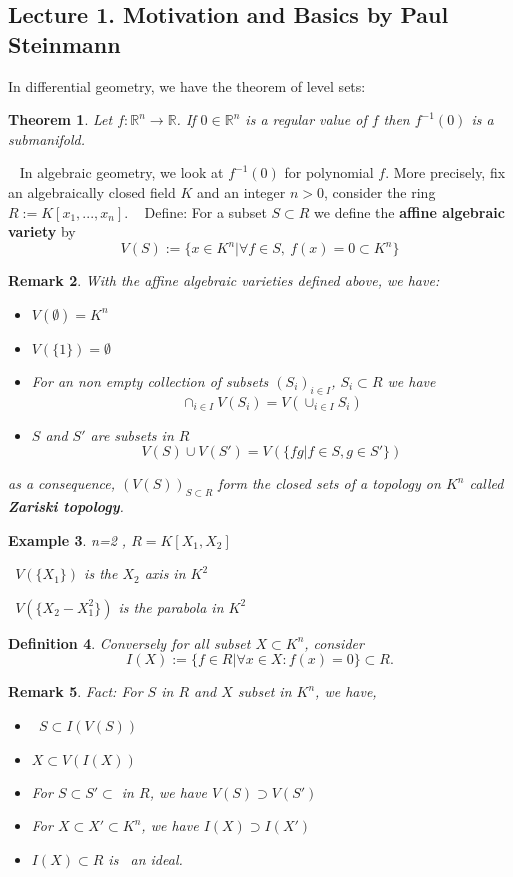 \documentclass[11pt]{article}
\newtheorem{thm}{Theorem}[section]
\newtheorem{dfn}[thm]{Definition}
\newtheorem{rmk}[thm]{Remark}
\newtheorem{ex}[thm]{Example}
\newcommand{\reals}{\mathbb R}
\begin{document}
\subsection{Lecture 1. Motivation and Basics by Paul Steinmann}
In differential geometry, we have the theorem of level sets:
\begin{thm}
Let $f:\reals^n \rightarrow \reals$.
If $0 \in \reals^n$ is a regular value of $f$ then $f^{-1}(0)$ is a submanifold.
\end{thm} 
 
In algebraic geometry, we look at $f^{-1}(0)$ for polynomial $f$.
More precisely, fix an algebraically closed field $K$ and an integer $n>0$, consider the ring $R:=K[x_1,...,x_n]$.
 
Define: For a subset $S\subset R$ we define the \textbf{affine algebraic variety} by
\begin{equation}
V(S):=\{x\in K^n| \forall f \in S,\ f(x)=0\subset K^n\}
\end{equation}
\begin{rmk}
With the affine algebraic varieties defined above, we have:
\begin{itemize}
\item $V(\emptyset)=K^n$
\item $ V(\{1\})=\emptyset$
\item   For an non empty collection of subsets $(S_i)_{i\in I}$, $S_i\subset R$ we have 
\begin{equation*}
    \cap_{i\in I}V(S_i)=V(\cup_{i\in I} S_i)
\end{equation*}
\item $S$ and $S'$ are subsets in $R$
\begin{equation*}
    V(S)\cup V(S')=V(\{fg| f\in S, g\in S'\})
\end{equation*}
\end{itemize}
as a consequence, 
    $(V(S))_{S\subset R}$ form the closed sets of a topology on $K^n$ called \textbf{Zariski topology}.
\end{rmk}
\begin{ex}
n=2 , $R=K[X_1,X_2]$

 $V(\{X_1\})$ is the $X_2$ axis in $K^2$

 $V(\{X_2-X_1^2\})$ is the parabola in $K^2$
\end{ex}

\begin{dfn}
Conversely for all subset $X \subset K^n$, consider 
          $$ I(X):=\{f\in R | \forall x\in X: f(x)=0\}\subset R.$$
\end{dfn}
\begin{rmk}
Fact: For $S$ in $R$ and $X$ subset in $K^n$, we have, 
\begin{itemize}
\item
 $S\subset I(V(S))$
\item
 $X \subset V(I(X))$
\item
 For $S\subset S' \subset$ in $R$, we have $V(S)\supset V(S')$
\item
 For $X \subset X'\subset K^n$, we have $ I(X)\supset I(X')$
\item
 $I(X) \subset R$ is  an ideal.
\end{itemize}
\end{rmk}
\end{document}
